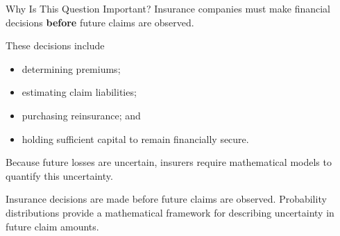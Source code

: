 \documentclass[
  ignorenonframetext,
  aspectratio=169,
]{beamer}
\providecommand{\tightlist}{%
  \setlength{\itemsep}{0pt}\setlength{\parskip}{0pt}}
\begin{document}
\begin{frame}{Why Is This Question Important?}
\protect{}\label{why-is-this-question-important}
Insurance companies must make financial decisions \textbf{before} future
claims are observed.

These decisions include

\begin{itemize}
\tightlist
\item
  determining premiums;
\item
  estimating claim liabilities;
\item
  purchasing reinsurance; and
\item
  holding sufficient capital to remain financially secure.
\end{itemize}

Because future losses are uncertain, insurers require mathematical
models to quantify this uncertainty.

\begin{tcolorbox}[enhanced jigsaw, arc=.35mm, bottomrule=.15mm, bottomtitle=1mm, breakable, colback=white, colbacktitle=quarto-callout-note-color!10!white, colframe=quarto-callout-note-color-frame, coltitle=black, left=2mm, leftrule=.75mm, opacityback=0, opacitybacktitle=0.6, rightrule=.15mm, title=\textcolor{quarto-callout-note-color}{\faInfo}\hspace{0.5em}{Key Idea}, titlerule=0mm, toprule=.15mm, toptitle=1mm]

Insurance decisions are made before future claims are observed.
Probability distributions provide a mathematical framework for
describing uncertainty in future claim amounts.

\end{tcolorbox}
\end{frame}
\end{document}
